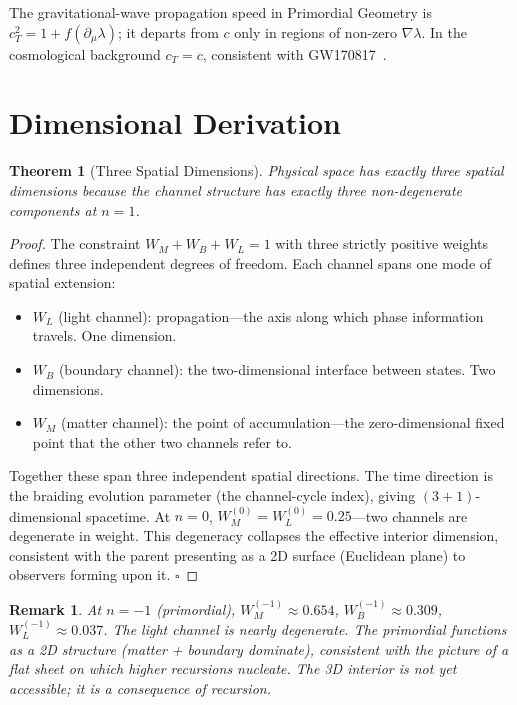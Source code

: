\documentclass[prd,twocolumn,preprintnumbers,amsmath,amssymb]{revtex4-2}
\newtheorem{theorem}{Theorem}
\newtheorem{remark}{Remark}
\newcommand{\WL}{W_{L}}
\newcommand{\WB}{W_{B}}
\newcommand{\WM}{W_{M}}
\begin{document}
The gravitational-wave propagation speed in Primordial Geometry is $c_T^2 = 1 +
f(\partial_\mu\lambda)$; it departs from $c$ only in regions of non-zero
$\nabla\lambda$.  In the cosmological background $c_T = c$, consistent with
GW170817~\cite{GW170817}.

\section{Dimensional Derivation}
\label{sec:dims}

\begin{theorem}[Three Spatial Dimensions]
Physical space has exactly three spatial dimensions because the channel
structure has exactly three non-degenerate components at $n=1$.
\end{theorem}
\begin{proof}
The constraint $\WM + \WB + \WL = 1$ with three strictly positive weights
defines three independent degrees of freedom.  Each channel spans one mode of
spatial extension:
\begin{itemize}
  \item $\WL$ (light channel): propagation---the axis along which phase
        information travels. One dimension.
  \item $\WB$ (boundary channel): the two-dimensional interface between states.
        Two dimensions.
  \item $\WM$ (matter channel): the point of accumulation---the zero-dimensional
        fixed point that the other two channels refer to.
\end{itemize}
Together these span three independent spatial directions.  The time direction
is the braiding evolution parameter (the channel-cycle index), giving
$(3+1)$-dimensional spacetime.  At $n=0$, $\WM^{(0)} = \WL^{(0)} = 0.25$---two
channels are degenerate in weight.  This degeneracy collapses the effective
interior dimension, consistent with the parent presenting as a 2D surface
(Euclidean plane) to observers forming upon it. \hfill$\square$
\end{proof}

\begin{remark}
At $n=-1$ (primordial), $\WM^{(-1)}\approx0.654$, $\WB^{(-1)}\approx0.309$,
$\WL^{(-1)}\approx0.037$.  The light channel is nearly degenerate.  The
primordial functions as a 2D structure (matter + boundary dominate), consistent
with the picture of a flat sheet on which higher recursions nucleate.  The
3D interior is not yet accessible; it is a consequence of recursion.
\end{remark}
\end{document}
